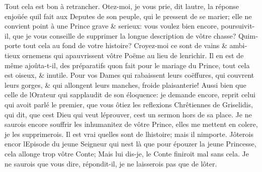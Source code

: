 \documentclass[14pt,a4paper]{memoir}
\begin{document}
{{\begin{otherlanguage}{french}
Tout cela est bon à retrancher. Otez-moi, je vous prie, dit
l\textquotesingle autre, la réponse enjoüée qu\textquotesingle il fait
aux Deputes de son peuple, qui le pressent de se marier; elle ne
convient point à une Prince grave \& serieux: vous voulez bien encore,
poursuivit-il, que je vous conseille de supprimer la longue description
de vôtre chasse? Qu\textquotesingle importe tout cela au fond de votre
histoire? Croyez-moi ce sont de vains \& ambitieux ornemens qui
apauvrissent vôtre Poëme au lieu de l\textquotesingle enrichir. Il en
est de même ajoûta-t-il, des préparatifs qu\textquotesingle on fait pour
le mariage du Prince, tout cela est oiseux, \& inutile. Pour vos Dames
qui rabaissent leurs coëffures, qui couvrent leurs gorges, \& qui
allongent leurs manches, froide plaisanterie! Aussi bien que celle de
l\textquotesingle Orateur qui s\textquotesingle applaudit de son
éloquence: je demande encore, reprit celui qui avoit parlé le premier,
que vous ôtiez les reflexions Chrêtiennes de Griselidis, qui dit, que
c\textquotesingle est Dieu qui veut l\textquotesingle éprouver,
c\textquotesingle est un sermon hors de sa place. Je ne saurois encore
souffrir les inhumanitez de vôtre Prince, elles me mettent en colere, je
les supprimerois. Il est vrai qu\textquotesingle elles sont de
l\textquotesingle histoire; mais il n\textquotesingle importe.
J\textquotesingle ôterois encor l\textquotesingle Episode du jeune
Seigneur qui n\textquotesingle est là que pour épouzer la jeune
Princesse, cela allonge trop vôtre Conte; Mais lui dis-je, le Conte
finiroit mal sans cela. Je ne saurois que vous dire, répondit-il, je ne
laisserois pas que de l\textquotesingle ôter.


\end{otherlanguage}}}
\end{document}

